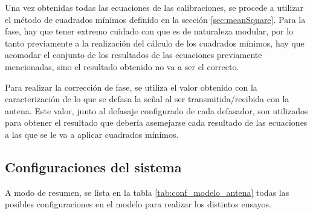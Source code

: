 Una vez obtenidas todas las ecuaciones de las calibraciones, se procede a utilizar el método de cuadrados mínimos definido en 
la sección \ref{sec:meanSquare}. Para la fase, hay que tener extremo cuidado con que es de naturaleza modular, por lo tanto 
previamente a la realización del cálculo de los cuadrados mínimos, hay que acomodar el conjunto de los resultados de las 
ecuaciones previamente mencionadas, sino el resultado obtenido no va a ser el correcto.

Para realizar la corrección de fase, se utiliza el valor obtenido con la caracterización de lo que se defasa la señal al ser 
transmitida/recibida con la antena. Este valor, junto al defasaje configurado de cada defasador, son utilizados para obtener el
resultado que debería asemejarse cada resultado de las ecuaciones a las que se le va a aplicar cuadrados mínimos. 

\subsection{Configuraciones del sistema}

A modo de resumen, se lista en la tabla \ref{tab:conf_modelo_antena} todas las posibles configuraciones en el modelo para 
realizar los distintos ensayos.

